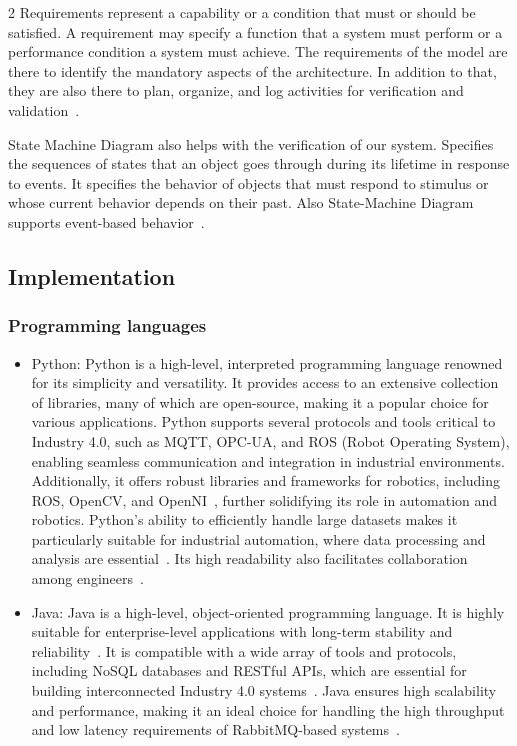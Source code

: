 \documentclass{article}
\begin{document}
\begin{multicols}{2}
Requirements represent a capability or a condition that must or should be satisfied. A requirement may specify a function that a system must perform or a performance condition a system must achieve. The requirements of the model are there to identify the mandatory aspects of the architecture. In addition to that, they are also there to plan, organize, and log activities for verification and validation~\cite{b5}.

State Machine Diagram also helps with the verification of our system.
Specifies the sequences of states that an object goes through during its lifetime in response to events. It specifies the behavior of objects that must respond to stimulus or whose current behavior depends on their past. Also State-Machine Diagram supports event-based behavior~\cite{b5}. 

\subsection{Implementation}
\subsubsection{Programming languages}
\begin{itemize}
    \item Python: Python is a high-level, interpreted programming language renowned for its simplicity and versatility. It provides access to an extensive collection of libraries, many of which are open-source, making it a popular choice for various applications. Python supports several protocols and tools critical to Industry 4.0, such as MQTT, OPC-UA, and ROS (Robot Operating System), enabling seamless communication and integration in industrial environments. Additionally, it offers robust libraries and frameworks for robotics, including ROS, OpenCV, and OpenNI~\cite{b9}, further solidifying its role in automation and robotics. Python's ability to efficiently handle large datasets makes it particularly suitable for industrial automation, where data processing and analysis are essential~\cite{b10}. Its high readability also facilitates collaboration among engineers~\cite{b10}.
    \item Java: Java is a high-level, object-oriented programming language. It is highly suitable for enterprise-level applications with long-term stability and reliability~\cite{b13}. It is compatible with a wide array of tools and protocols, including NoSQL databases and RESTful APIs, which are essential for building interconnected Industry 4.0 systems~\cite{b13}. Java ensures high scalability and performance, making it an ideal choice for handling the high throughput and low latency requirements of RabbitMQ-based systems~\cite{b13}.
\end{itemize}


\end{multicols}
\end{document}
